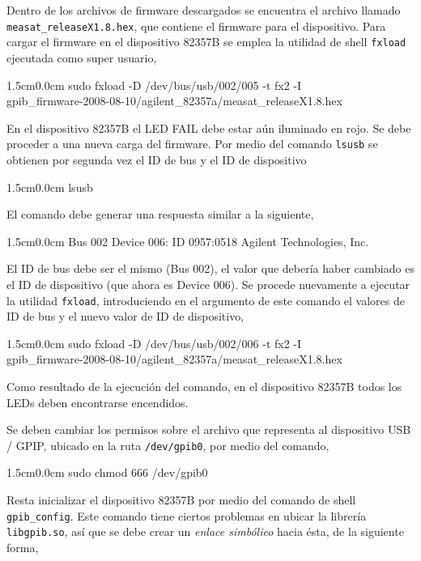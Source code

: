 \documentclass[paper=letter,oneside,fontsize=11pt, parskip=full]{scrartcl}
\newenvironment{code}
	{\begin{adjustwidth}{1.5cm}{0.0cm}\ttfamily}
	{\end{adjustwidth}}
\begin{document}
		Dentro de los archivos de firmware descargados se encuentra el archivo llamado \texttt{measat\_releaseX1.8.hex}, que contiene el firmware para el dispositivo. Para cargar el firmware en el dispositivo 82357B se emplea la utilidad de shell \texttt{fxload} ejecutada como super usuario, 
		
		\begin{code}
			sudo fxload -D /dev/bus/usb/002/005  -t fx2 -I \\ gpib\_firmware-2008-08-10/agilent\_82357a/measat\_releaseX1.8.hex
		\end{code}
		
		En el dispositivo 82357B el LED FAIL debe estar aún iluminado en rojo. Se debe proceder a una nueva carga del firmware. Por medio del comando \texttt{lsusb} se obtienen por segunda vez el ID de bus y el ID de dispositivo
		
		\begin{code}
			lsusb
		\end{code}
	
		El comando debe generar una respuesta similar a la siguiente,
		
		\begin{code}
			Bus 002 Device 006: ID 0957:0518 Agilent Technologies, Inc.
		\end{code}
		
		El ID de bus debe ser el mismo (Bus 002), el valor que debería haber cambiado es el ID de dispositivo (que ahora es Device 006). Se procede nuevamente a ejecutar la utilidad \texttt{fxload}, introduciendo en el argumento de este comando el valores de ID de bus y el nuevo valor de ID de dispositivo,
		
		\begin{code}
			sudo fxload -D /dev/bus/usb/002/006  -t fx2 -I \\ gpib\_firmware-2008-08-10/agilent\_82357a/measat\_releaseX1.8.hex
		\end{code}
		
		Como resultado de la ejecución del comando, en el dispositivo 82357B todos los LEDs deben encontrarse encendidos.		
		
		Se deben cambiar los permisos sobre el archivo que representa al dispositivo USB / GPIP, ubicado en la ruta \texttt{/dev/gpib0}, por medio del comando,
		
		\begin{code}
			sudo chmod 666 /dev/gpib0
		\end{code}
		
		Resta inicializar el dispositivo 82357B por medio del comando de shell \texttt{gpib\_config}. Este comando tiene ciertos problemas en ubicar la librería \texttt{libgpib.so}, así que se debe crear un \emph{enlace simbólico} hacia ésta, de la siguiente forma,
		
\end{document}

